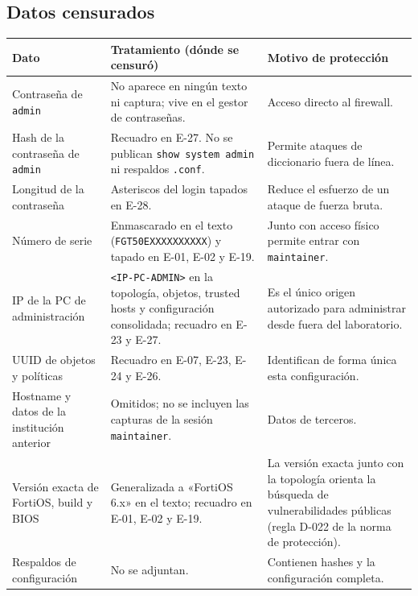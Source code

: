 \documentclass[11pt,a4paper]{article}
\begin{document}
\subsection*{Datos censurados}
{\small\noindent
\begin{tabularx}{\linewidth}{@{}P{3.4cm}P{6.2cm}Y@{}}
\toprule
{}\textbf{Dato} & \textbf{Tratamiento (dónde se censuró)} & \textbf{Motivo de protección}\\\midrule
Contraseña de \texttt{admin} & No aparece en ningún texto ni captura; vive en el gestor de contraseñas. & Acceso directo al firewall. \\
Hash de la contraseña de \texttt{admin} & Recuadro en E-27. No se publican \texttt{show system admin} ni respaldos \texttt{.conf}. & Permite ataques de diccionario fuera de línea. \\
Longitud de la contraseña & Asteriscos del login tapados en E-28. & Reduce el esfuerzo de un ataque de fuerza bruta. \\
Número de serie & Enmascarado en el texto (\texttt{FGT50EXXXXXXXXXX}) y tapado en E-01, E-02 y E-19. & Junto con acceso físico permite entrar con \texttt{maintainer}. \\
IP de la PC de administración & \texttt{<IP-PC-ADMIN>} en la topología, objetos, trusted hosts y configuración consolidada; recuadro en E-23 y E-27. & Es el único origen autorizado para administrar desde fuera del laboratorio. \\
UUID de objetos y políticas & Recuadro en E-07, E-23, E-24 y E-26. & Identifican de forma única esta configuración. \\
Hostname y datos de la institución anterior & Omitidos; no se incluyen las capturas de la sesión \texttt{maintainer}. & Datos de terceros. \\
Versión exacta de FortiOS, build y BIOS & Generalizada a «FortiOS 6.x» en el texto; recuadro en E-01, E-02 y E-19. & La versión exacta junto con la topología orienta la búsqueda de vulnerabilidades públicas (regla D-022 de la norma de protección). \\
Respaldos de configuración & No se adjuntan. & Contienen hashes y la configuración completa. \\
\bottomrule
\end{tabularx}\par}
\end{document}
